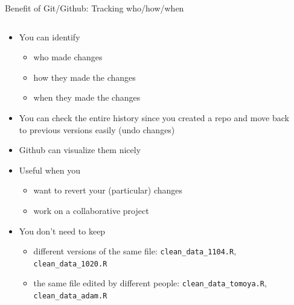 \documentclass[handout,pdftex,10pt,aspectratio=169]{beamer}
\begin{document}
\begin{frame}{Benefit of Git/Github: Tracking who/how/when}
  \setlength{\leftmarginii}{10pt}
  \begin{columns}%
    \begin{column}{0.46\linewidth}
    \begin{itemize}
      \item<1-> You can identify %
      \begin{itemize}
        \item<1-> who made changes 
        \item<2-> how they made the changes
        \item<3-> when they made the changes
      \end{itemize}
      \item<4-> You can check the entire history since you created a repo
      and move back to previous versions easily (undo changes)
      \item<5-> Github can visualize them nicely
      \medskip
      \item<7-> Useful when you 
      \begin{itemize}
        \item<7-> want to revert your (particular) changes
        \item<8-> work on a collaborative project
      \end{itemize}
      \medskip
      \item<9-> You don't need to keep 
      \begin{itemize}
        \item<9-> different versions of the same file: \texttt{clean\_data\_1104.R}, \texttt{clean\_data\_1020.R}
        \item<10-> the same file edited by different people: \texttt{clean\_data\_tomoya.R}, \texttt{clean\_data\_adam.R}
      \end{itemize}
    \end{itemize}      
  \end{column}\hfill
  \begin{column}{0.53\linewidth}
    \centering

\end{column}
\end{columns}
\end{frame}
\end{document}
